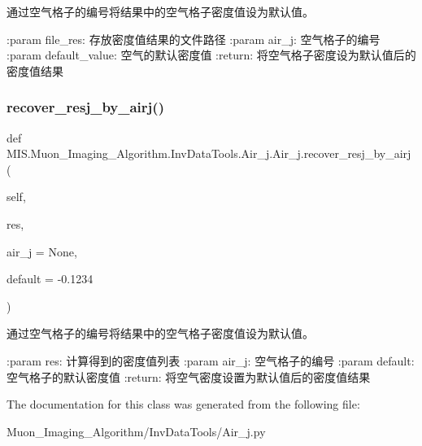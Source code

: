 \begin{DoxyVerb}通过空气格子的编号将结果中的空气格子密度值设为默认值。

:param file_res: 存放密度值结果的文件路径
:param air_j: 空气格子的编号
:param default_value: 空气的默认密度值
:return: 将空气格子密度设为默认值后的密度值结果
\end{DoxyVerb}
 \mbox{\label{classMIS_1_1Muon__Imaging__Algorithm_1_1InvDataTools_1_1Air__j_1_1Air__j_ada2ee91267d1f52026724c813da3e33b}} 
\subsubsection{\texorpdfstring{recover\+\_\+resj\+\_\+by\+\_\+airj()}{recover\_resj\_by\_airj()}}
{\footnotesize\ttfamily def M\+I\+S.\+Muon\+\_\+\+Imaging\+\_\+\+Algorithm.\+Inv\+Data\+Tools.\+Air\+\_\+j.\+Air\+\_\+j.\+recover\+\_\+resj\+\_\+by\+\_\+airj (\begin{DoxyParamCaption}\item[{}]{self,  }\item[{}]{res,  }\item[{}]{air\+\_\+j = {\ttfamily None},  }\item[{}]{default = {\ttfamily -\/0.1234} }\end{DoxyParamCaption})}

\begin{DoxyVerb}通过空气格子的编号将结果中的空气格子密度值设为默认值。

:param res: 计算得到的密度值列表
:param air_j: 空气格子的编号
:param default: 空气格子的默认密度值
:return: 将空气密度设置为默认值后的密度值结果
\end{DoxyVerb}
 

The documentation for this class was generated from the following file\+:\begin{DoxyCompactItemize}
\item 
Muon\+\_\+\+Imaging\+\_\+\+Algorithm/\+Inv\+Data\+Tools/Air\+\_\+j.\+py\end{DoxyCompactItemize}
